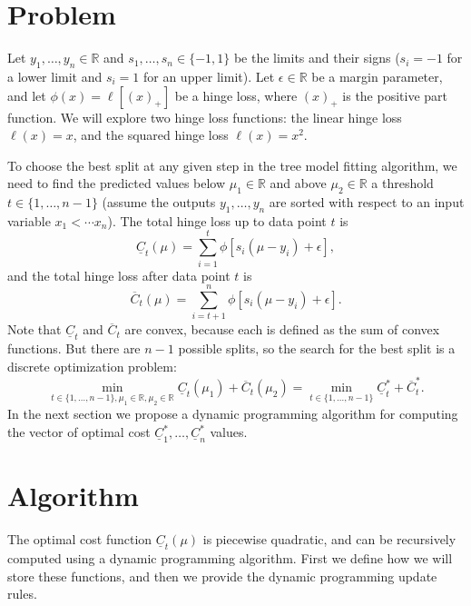 \documentclass{article}
\begin{document}
\section{Problem}
Let $y_1,\dots,y_n\in\mathbb R$ and $s_1,\dots,s_n\in\{-1,1\}$ be the
limits and their signs ($s_i=-1$ for a lower limit and $s_i=1$ for an
upper limit). Let $\epsilon\in\mathbb R$ be a margin parameter, and
let $\phi(x)=\ell[(x)_+]$ be a hinge loss, where $(x)_+$ is the
positive part function. We will explore two hinge loss functions: the
linear hinge loss $\ell(x)=x$, and the squared hinge loss
$\ell(x)=x^2$.

To choose the best split at any given step in the tree model fitting
algorithm, we need to find the predicted values below
$\mu_1\in\mathbb R$ and above $\mu_2\in\mathbb R$ a threshold
$t\in\{1,\dots,n-1\}$ (assume the outputs $y_1,\dots,y_n$ are sorted
with respect to an input variable $x_1<\cdots x_n$).  The total hinge
loss up to data point $t$ is
\begin{equation}
  \label{eq:underline_C}
  \underline C_t(\mu) = \sum_{i=1}^t \phi[s_i(\mu-y_i)+\epsilon],
\end{equation}
and the total hinge loss after data point $t$ is
\begin{equation}
  \label{eq:overline_C}
  \overline C_t(\mu) = \sum_{i=t+1}^n \phi[s_i(\mu-y_i)+\epsilon].
\end{equation}
Note that $\underline C_t$ and $\overline C_t$ are convex, because
each is defined as the sum of convex functions. But there are $n-1$
possible splits, so the search for the best split is a discrete
optimization problem:
\begin{equation}
  \label{eq:min_hinge_loss}
  \min_{
    t\in\{1,\dots,n-1\},
    \mu_1\in\mathbb R,
    \mu_2\in\mathbb R
  }
  \underline C_t(\mu_1) + \overline C_t(\mu_2) = 
  \min_{
    t\in\{1,\dots,n-1\}
  }
  \underline{ C}^*_t + \overline C^*_t.
\end{equation}
In the next section we propose a dynamic programming algorithm for
computing the vector of optimal cost
$\underline{ C}^*_1,\dots,\underline{ C}^*_n$ values.

\section{Algorithm}

The optimal cost function $\underline C_t(\mu)$ is piecewise
quadratic, and can be recursively computed using a dynamic programming
algorithm. First we define how we will store these functions, and then
we provide the dynamic programming update rules.
\end{document}
